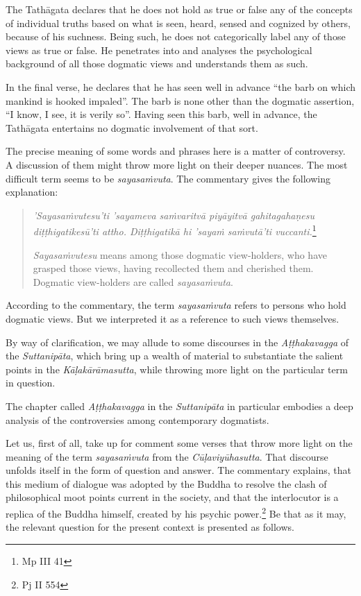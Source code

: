 The Tathāgata declares that he does not hold as true or false any of the concepts of individual truths based on what is seen, heard, sensed and cognized by others, because of his suchness. Being such, he does not categorically label any of those views as true or false. He penetrates into and analyses the psychological background of all those dogmatic views and understands them as such.

In the final verse, he declares that he has seen well in advance ``the barb on which mankind is hooked impaled''. The barb is none other than the dogmatic assertion, ``I know, I see, it is verily so''. Having seen this barb, well in advance, the Tathāgata entertains no dogmatic involvement of that sort.

The precise meaning of some words and phrases here is a matter of controversy. A discussion of them might throw more light on their deeper nuances. The most difficult term seems to be \emph{sayasaṁvuta}. The commentary gives the following explanation:

\begin{quote}
\emph{'Sayasaṁvutesu'ti 'sayameva saṁvaritvā piyāyitvā gahitagahaṇesu diṭṭhigatikesū'ti attho. Diṭṭhigatikā hi 'sayaṁ saṁvutā'ti vuccanti.}\footnote{Mp III 41}

\emph{Sayasaṁvutesu} means among those dogmatic view-holders, who have grasped those views, having recollected them and cherished them. Dogmatic view-holders are called \emph{sayasaṁvuta}.
\end{quote}

According to the commentary, the term \emph{sayasaṁvuta} refers to persons who hold dogmatic views. But we interpreted it as a reference to such views themselves.

By way of clarification, we may allude to some discourses in the \emph{Aṭṭhakavagga} of the \emph{Suttanipāta}, which bring up a wealth of material to substantiate the salient points in the \emph{Kāḷakārāmasutta}, while throwing more light on the particular term in question.

The chapter called \emph{Aṭṭhakavagga} in the \emph{Suttanipāta} in particular embodies a deep analysis of the controversies among contemporary dogmatists.

Let us, first of all, take up for comment some verses that throw more light on the meaning of the term \emph{sayasaṁvuta} from the \emph{Cūḷaviyūhasutta}. That discourse unfolds itself in the form of question and answer. The commentary explains, that this medium of dialogue was adopted by the Buddha to resolve the clash of philosophical moot points current in the society, and that the interlocutor is a replica of the Buddha himself, created by his psychic power.\footnote{Pj II 554} Be that as it may, the relevant question for the present context is presented as follows.

